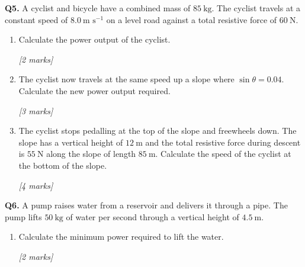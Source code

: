 \begin{tcolorbox}[colback=white, colframe=midblue, breakable]

\begin{minipage}{\linewidth}
\textbf{Q5.} A cyclist and bicycle have a combined mass of $85\ \text{kg}$. The cyclist travels at a constant speed of $8.0\ \text{m s}^{-1}$ on a level road against a total resistive force of $60\ \text{N}$.
\end{minipage}

\begin{enumerate}[label=(\alph*)]
  \item \begin{minipage}[t]{\linewidth}
  Calculate the power output of the cyclist.
  \par\hfill\textit{[2 marks]}
  \vspace{2.5cm}
  \end{minipage}

  \item \begin{minipage}[t]{\linewidth}
  The cyclist now travels at the same speed up a slope where $\sin\theta = 0.04$. Calculate the new power output required.
  \par\hfill\textit{[3 marks]}
  \vspace{3.5cm}
  \end{minipage}

  \item \begin{minipage}[t]{\linewidth}
  The cyclist stops pedalling at the top of the slope and freewheels down. The slope has a vertical height of $12\ \text{m}$ and the total resistive force during descent is $55\ \text{N}$ along the slope of length $85\ \text{m}$. Calculate the speed of the cyclist at the bottom of the slope.
  \par\hfill\textit{[4 marks]}
  \vspace{4.5cm}
  \end{minipage}
\end{enumerate}

\begin{minipage}{\linewidth}
\textbf{Q6.} A pump raises water from a reservoir and delivers it through a pipe. The pump lifts $50\ \text{kg}$ of water per second through a vertical height of $4.5\ \text{m}$.

\begin{enumerate}[label=(\alph*)]
  \item Calculate the minimum power required to lift the water.
  \par\hfill\textit{[2 marks]}
  \vspace{3cm}


\end{enumerate}
\end{minipage}
\end{tcolorbox}
